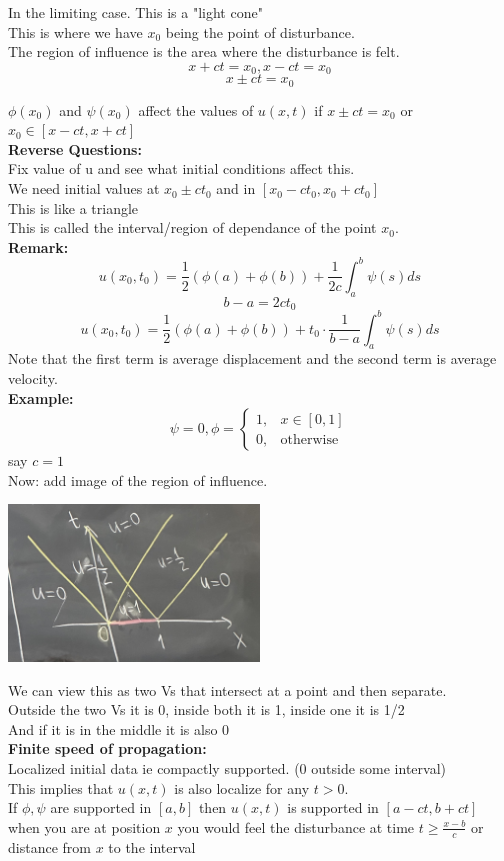 \documentclass{article}
\begin{document}
In the limiting case. This is a "light cone"\\
This is where we have $x_0$ being the point of disturbance.\\
The region of influence is the area where the disturbance is felt.\\ 
$$ x +ct = x_0, x - ct = x_0$$
$$ x \pm ct = x_0$$

$ \phi(x_0)$ and $\psi(x_0)$ affect the values of $u(x,t)$ if $x \pm ct = x_0$ or $x_0 \in [x - ct, x + ct]$\\

\textbf{Reverse Questions:}\\
Fix value of u and see what initial conditions affect this.\\
We need initial values at $x_0 \pm ct_0$ and in $[x_0 - ct_0, x_0 + ct_0]$\\
This is like a triangle\\
This is called the interval/region of dependance of the point $x_0$.\\
\textbf{Remark: }\\
$$u(x_0,t_0) = \frac{1}{2} \left( \phi(a) + \phi(b) \right) + \frac{1}{2c} \int_{a}^{b} \psi(s) ds$$
$$b-a = 2ct_0$$
$$ u(x_0,t_0) = \frac{1}{2} \left( \phi(a) + \phi(b) \right) + t_0 \cdot \frac{1}{b-a} \int_{a}^{b} \psi(s) ds$$
Note that the first term is average displacement and the second term is average velocity.\\
\textbf{Example: }\\
$$\psi = 0, \phi = \begin{cases}
    1, & x \in [0,1]\\
    0, & \text{otherwise}
\end{cases}
$$
say $c =1 $\\
Now: add image of the region of influence.\\
\begin{center}
\includegraphics[width=0.5\textwidth]{IMGs/PDEs_Triangle.jpg}
\end{center}
We can view this as two Vs that intersect at a point and then separate.\\
Outside the two Vs it is 0, inside both it is 1, inside one it is 1/2\\
And if it is in the middle it is also 0\\
\textbf{Finite speed of propagation:}\\
Localized initial data ie compactly supported. (0 outside some interval)\\
This implies that $u(x,t)$ is also localize for any $t>0$.\\
If $\phi, \psi$ are supported in $[a,b]$ then $u(x,t)$ is supported in $[a-ct,b+ct]$\\
when you are at position $x$ you would feel the disturbance at time $t \geq \frac{x-b}{c}$ or distance from $x$ to the interval
\end{document}
